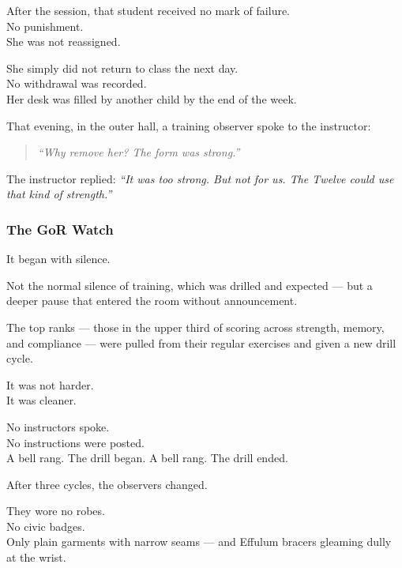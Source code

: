\documentclass[12pt]{article}
\begin{document}
\vspace{1em}

After the session, that student received no mark of failure.\\
No punishment.\\
She was not reassigned.

She simply did not return to class the next day.\\
No withdrawal was recorded.\\
Her desk was filled by another child by the end of the week.

\vspace{1em}

That evening, in the outer hall, a training observer spoke to the instructor:

\begin{quote}
\textit{“Why remove her? The form was strong.”}
\end{quote}

The instructor replied: \textit{“It was too strong. But not for us. The Twelve could use that kind of strength.”}

\dotfill

\subsubsection*{The GoR Watch}

It began with silence.

Not the normal silence of training, which was drilled and expected — but a deeper pause that entered the room without announcement.

The top ranks — those in the upper third of scoring across strength, memory, and compliance — were pulled from their regular exercises and given a new drill cycle.

It was not harder.\\
It was cleaner.

No instructors spoke.\\
No instructions were posted.\\
A bell rang. The drill began. A bell rang. The drill ended.

\vspace{1em}

After three cycles, the observers changed.

They wore no robes.\\
No civic badges.\\
Only plain garments with narrow seams — and Effulum bracers gleaming dully at the wrist.
\end{document}
